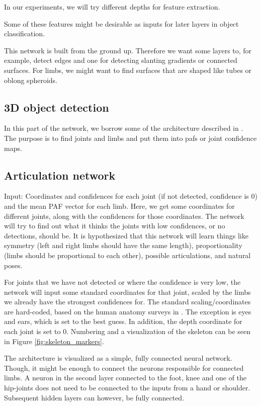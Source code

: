 In our experiments, we will try different depths for feature extraction.

Some of these features might be desirable as inputs for later layers in object classification.

This network is built from the ground up. Therefore we want some layers to, for example, detect edges and one for detecting slanting gradients or connected surfaces. For limbs, we might want to find surfaces that are shaped like tubes or oblong spheroids.

\subsection{3D object detection}\label{subsec:obj_detect}
In this part of the network, we borrow some of the architecture described in \cite{cao2017realtime}. The purpose is to find joints and limbs and put them into \gls{paf}s or joint confidence maps. 

\subsection{Articulation network}\label{subsec:articulation}
Input: Coordinates and confidences for each joint (if not detected, confidence is 0) and the mean PAF vector for each limb.
Here, we get some coordinates for different joints, along with the confidences for those coordinates. The network will try to find out what it thinks the joints with low confidences, or no detections, should be. It is hypothesized that this network will learn things like symmetry (left and right limbs should have the same length), proportionality (limbs should be proportional to each other), possible articulations, and natural poses.

For joints that we have not detected or where the confidence is very low, the network will input some standard coordinates for that joint, scaled by the limbs we already have the strongest confidences for. The standard scaling/coordinates are hard-coded, based on the human anatomy surveys in \cite{bodySegmentParams}. The exception is eyes and ears, which is set to the best guess. In addition, the depth coordinate for each joint is set to 0. Numbering and a visualization of the skeleton can be seen in Figure \ref{fig:skeleton_markers}.

The architecture is visualized as a simple, fully connected neural network. Though, it might be enough to connect the neurons responsible for connected limbs. A neuron in the second layer connected to the foot, knee and one of the hip-joints does not need to be connected to the inputs from a hand or shoulder. Subsequent hidden layers can however, be fully connected.

